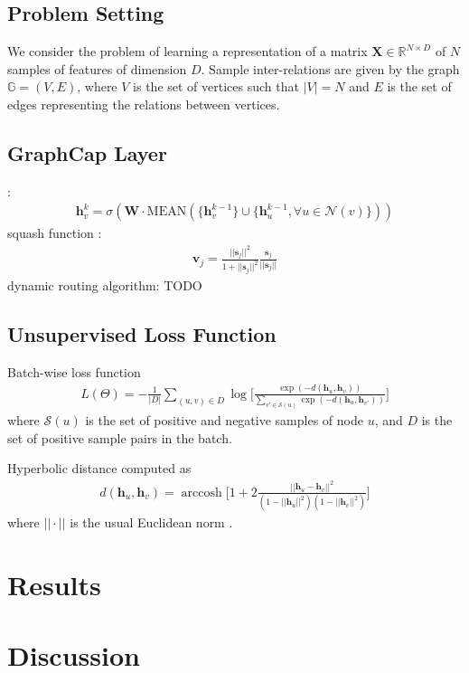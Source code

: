 \documentclass{IEEEtran}
\DeclareMathOperator{\arccosh}{arccosh}
{\tiny }
\begin{document}
	\subsection{Problem Setting}
	We consider the problem of learning a representation of a matrix $\textbf{X} \in \mathbb{R}^{N\times D}$ of $N$ samples of features of dimension $D$. Sample inter-relations are given by the graph $\mathbb{G} = (V, E)$, where $V$ is the set of vertices such that $|V|=N$ and $E$ is the set of edges representing the relations between vertices. 
	
	\subsection{GraphCap Layer}
	\cite{hamilton2017inductive}:
	\begin{align*}
	\textbf{h}^k_v = \sigma(\textbf{W}\cdot \mathrm{MEAN}(\{\textbf{h}^{k-1}_v\}\cup\{\textbf{h}^{k-1}_u, \forall u\in \mathcal{N}(v)\}))
	\end{align*}
	squash function \cite{sabour2017dynamic}:
	\begin{align*}
	\textbf{v}_j = \frac{||\textbf{s}_j||^2}{1 + ||\textbf{s}_j||^2}
	\frac{\textbf{s}_j}{||\textbf{s}_j||}
	\end{align*}
	dynamic routing algorithm: \cite{sabour2017dynamic}
	TODO
	\subsection{Unsupervised Loss Function}
	Batch-wise loss function
	\begin{align*}
	L(\Theta) = -\frac{1}{|D|} \sum_{(u, v) \in D} \log \bigg[\frac{\exp(-d(\textbf{h}_u, \textbf{h}_v))}{\sum_{v' \in \mathcal{S}(u)} \exp(-d(\textbf{h}_u, \textbf{h}_{v'}))} \bigg]
	\end{align*}
	where $\mathcal{S}(u)$ is the set of positive and negative samples of node $u$, and $D$ is the set of positive sample pairs in the batch. 
	
	Hyperbolic distance computed as 
	\begin{align*}
	d(\textbf{h}_u, \textbf{h}_v) = \arccosh \bigg[1 + 2\frac{||\textbf{h}_u -\textbf{h}_v||^2}{(1 - ||\textbf{h}_u||^2)(1-||\textbf{h}_v||^2)}\bigg]
	\end{align*}
	where $||\cdot||$ is the usual Euclidean norm \cite{nickel2017poincar}.
	
	\section{Results}
	
	\section{Discussion}
	
	
	
	
	
\end{document}
